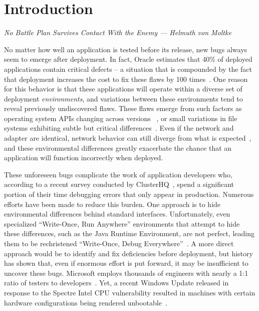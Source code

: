 \section{Introduction}
\label{SEC:introduction}
\textit{No Battle Plan Survives Contact With the Enemy --- Helmuth von Moltke}

No matter how well an application is tested before its release,
new bugs always seem to emerge after deployment.
In fact, Oracle estimates that 40\% of deployed applications
contain critical defects -- a situation that is compounded
by the fact that deployment
increases the cost to fix these flaws by 100 times~\cite{OracleAppQuality}.
One reason for this behavior
is that these applications will operate within a diverse set of
deployment \emph{environments},
and variations between these environments tend to
reveal previously undiscovered flaws.
These flaws emerge from
such factors as
operating system APIs changing across versions
~\cite{LinuxGlibcChanges},
or small variations in file systems exhibiting subtle but critical
differences~\cite{EXT4Layout, AppleHFS}.
Even if the network and adapter are identical,
network behavior can still diverge from what is expected~\cite{vbox},
and these environmental differences greatly exacerbate
the chance that an application will function incorrectly when deployed.

These unforeseen bugs
complicate the work of application developers who, according to a
recent survey conducted by ClusterHQ~\cite{ClusterHQSurvey},
spend a significant portion of their time
debugging errors that only appear in production.
Numerous efforts have been made to reduce this burden.
One approach
is to hide environmental differences behind standard interfaces.
Unfortunately,
even specialized ``Write-Once, Run Anywhere'' environments
that attempt to hide these differences,
such as the Java Runtime Environment,
are not perfect,
leading them to be rechristened ``Write-Once, Debug Everywhere''~\cite{WODE}.
A more direct approach would be
to identify and fix deficiencies before deployment,
but history has shown that,
even if enormous effort is put forward,
it may be insufficient to uncover these bugs.
Microsoft employs thousands of engineers with nearly a
1:1 ratio of testers to developers~\cite{Page2009}.
Yet, a recent Windows Update released
in response to the Spectre Intel CPU vulnerability
resulted in machines with certain hardware configurations
being rendered unbootable~\cite{kb4056892}.


